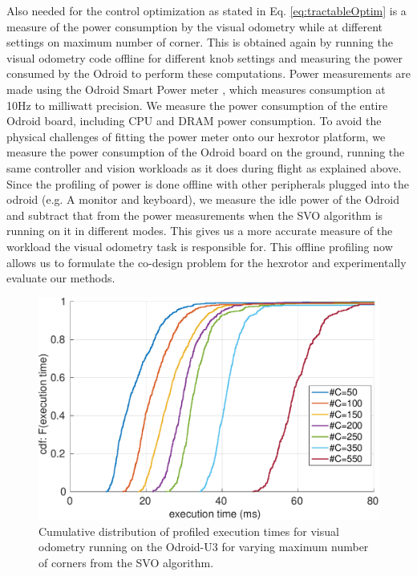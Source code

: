 Also needed for the control optimization as stated in Eq. \ref{eq:tractableOptim} is a measure of the power consumption by the visual odometry while at different settings on maximum number of corner. This is obtained again by running the visual odometry code offline for different knob settings and measuring the power consumed by the Odroid to perform these computations. Power measurements are made using the Odroid Smart Power meter \cite{OdroidSmartPower}, which measures consumption at 10Hz to milliwatt precision. We measure the power consumption of the entire Odroid board, including CPU and DRAM power consumption. To avoid the physical challenges of fitting the power meter onto our hexrotor platform, we measure the power consumption of the Odroid board on the ground, running the same controller and vision workloads as it does during flight as explained above. Since the profiling of power is done offline with other peripherals plugged into the odroid (e.g. A monitor and keyboard), we measure the idle power of the Odroid and subtract that from the power measurements when the SVO algorithm is running on it in different modes. This gives us a more accurate measure of the workload the visual odometry task is responsible for. This offline profiling now allows us to formulate the co-design problem for the hexrotor and experimentally evaluate our methods.


\begin{figure}[htbp]
  \centering
  \includegraphics[width=0.9\columnwidth]{figures/time_ecdf_millisec.pdf}
  \caption{Cumulative distribution of profiled execution times for visual odometry running on the Odroid-U3 for varying maximum number of corners from the SVO algorithm.}
  \label{fig:time_ecdf}
\end{figure}






